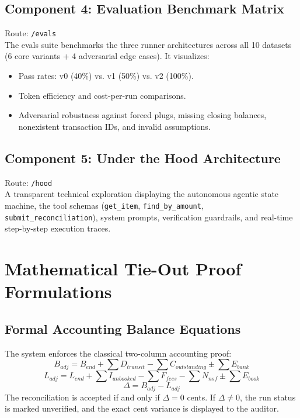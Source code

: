 \documentclass[10pt,a4paper]{article}
\begin{document}
\subsection{Component 4: Evaluation Benchmark Matrix}
Route: \texttt{/evals} \\
The evals suite benchmarks the three runner architectures across all 10 datasets (6 core variants + 4 adversarial edge cases). It visualizes:
\begin{itemize}[noitemsep]
    \item Pass rates: v0 (40\%) vs. v1 (50\%) vs. v2 (100\%).
    \item Token efficiency and cost-per-run comparisons.
    \item Adversarial robustness against forced plugs, missing closing balances, nonexistent transaction IDs, and invalid assumptions.
\end{itemize}

\subsection{Component 5: Under the Hood Architecture}
Route: \texttt{/hood} \\
A transparent technical exploration displaying the autonomous agentic state machine, the tool schemas (\texttt{get\_item}, \texttt{find\_by\_amount}, \texttt{submit\_reconciliation}), system prompts, verification guardrails, and real-time step-by-step execution traces.

\section{Mathematical Tie-Out Proof Formulations}

\subsection{Formal Accounting Balance Equations}
The system enforces the classical two-column accounting proof:
\begin{equation}
    B_{adj} = B_{end} + \sum D_{transit} - \sum C_{outstanding} \pm \sum E_{bank}
\end{equation}
\begin{equation}
    L_{adj} = L_{end} + \sum I_{unbooked} - \sum F_{fees} - \sum N_{nsf} \pm \sum E_{book}
\end{equation}
\begin{equation}
    \Delta = B_{adj} - L_{adj}
\end{equation}
The reconciliation is accepted if and only if $\Delta = 0$ cents. If $\Delta \neq 0$, the run status is marked unverified, and the exact cent variance is displayed to the auditor.
\end{document}
